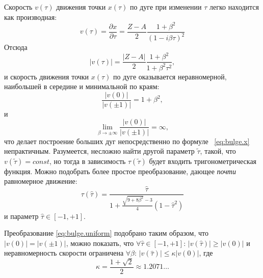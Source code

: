 Скорость $v(\tau)$
движения точки $x(\tau)$
по дуге при изменении $\tau$
легко находится как производная:
$$
v(\tau) =
  \frac{\partial x}{\partial \tau} =
  \frac{Z-A}{2}\frac{1+\beta^2}{\left(1 - i \beta \tau \right)^2}
$$
Отсюда
$$
|v(\tau)| =
  \frac{\left|Z-A\right|}{2}\frac{1+\beta^2}{1 + \beta^2 \tau^2}
  ,
$$
и скорость движения точки $x(\tau)$
по дуге оказывается неравномерной,
наибольшей в середине
и минимальной по краям:
$$
\frac{|v(0)|}{|v(\pm1)|} = 1+\beta^2
,
$$
и
$$
\lim_{\beta \to \pm \infty}
  \frac{|v(0)|}{|v(\pm1)|} =
  \infty
  ,
$$
что делает построение больших дуг непосредственно по формуле~
\eqref{eq:bulge.x}
непрактичным.
Разумеется,
несложно найти другой параметр
$\widetilde{\tau}$,
такой, что
$v(\widetilde{\tau}) = const$,
но тогда в зависимость
$\tau(\widetilde{\tau})$
будет входить тригонометрическая функция.
Можно подобрать более простое преобразование,
дающее
\textit{почти}
равномерное движение:
\begin{equation}
  \label{eq:bulge.uniform}
  \tau(\hat \tau) =
  \frac{\hat \tau}{1 + \frac{\sqrt{9+8\beta^2}-3}{4} \left(1 -  \hat \tau^2\right)}
\end{equation}
и параметр
$\hat \tau \in[-1,+1]$.

Преобразование
\eqref{eq:bulge.uniform}
подобрано таким образом,
что
$|v(0)|=|v(\pm 1)|$,
можно показать, что
$\forall \hat \tau \in[-1, +1]$:
$|v(\hat \tau)| \geqslant |v(0)|$
и неравномерность скорости ограничена
$\forall \beta$:
$|v(\hat \tau)| \leqslant \kappa |v(0)|$,
где
$$
\kappa = \frac{1+\sqrt{2}}{2}
  \approx 1.2071\dots
$$
